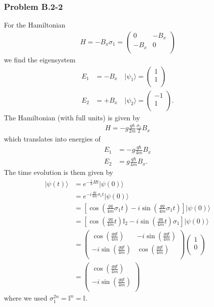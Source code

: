 \documentclass[10pt,a4paper]{article}
\theoremstyle{definition}
\begin{document}
\subsubsection{Problem B.2-2}
For the Hamiltonian
\begin{align}
H = -B_x\sigma_1=\left(
\begin{array}{cc}
 0 & -B_x  \\
 -B_x & 0  \\
\end{array}
\right)
\end{align}
we find the eigensystem
\begin{align}
E_1 &= -B_x\quad |\psi_1\rangle=\left(
\begin{array}{c}
 1 \\
 1 \\
\end{array}
\right)\\
E_2 &= +B_x\quad |\psi_2\rangle=\left(
\begin{array}{c}
-1 \\
 1 \\
\end{array}
\right).
\end{align}
The Hamiltonian (with full units) is given by
\begin{align}
H = -g\frac{q\hbar}{2m}\frac{\sigma_1}{2}B_x
\end{align}
which translates into energies of
\begin{align}
E_1 &= -g\frac{q\hbar}{4m}B_x\\
E_2 &= g\frac{q\hbar}{4m}B_x.
\end{align}
The time evolution is them given by
\begin{align}
|\psi(t)\rangle&=e^{-\frac{i}{\hbar}Ht}|\psi(0)\rangle\\
&=e^{-i\frac{gq}{4m}\sigma_1t}|\psi(0)\rangle\\
&=\left[\cos\left(\frac{gq}{4m}\sigma_1t\right)-i\sin\left(\frac{gq}{4m}\sigma_1t\right)\right]|\psi(0)\rangle\\
&=\left[\cos\left(\frac{gq}{4m}t\right)\mathbb{I}_2-i\sin\left(\frac{gq}{4m}t\right)\sigma_1\right]|\psi(0)\rangle\\
&=\left(
\begin{array}{cc}
 \cos \left(\frac{g q t}{4 m}\right) & -i \sin \left(\frac{g q t}{4 m}\right) \\
 -i \sin \left(\frac{g q t}{4 m}\right) & \cos \left(\frac{g q t}{4 m}\right) \\
\end{array}
\right)
\left(
\begin{array}{c}
 1 \\
 0 \\
\end{array}
\right)\\
&=\left(
\begin{array}{c}
 \cos \left(\frac{g q t}{4 m}\right) \\
 -i\sin \left(\frac{g q t}{4 m}\right) \\
\end{array}
\right)
\end{align}
where we used $\sigma_1^{2n}=\mathbb{I}^n=\mathbb{I}$.
\end{document}
